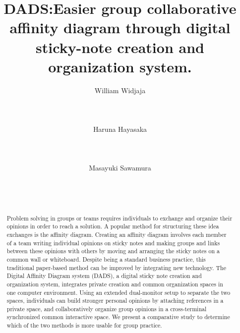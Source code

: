 \documentclass{sigchi}
\begin{document}
\title{DADS:Easier group collaborative affinity diagram through digital sticky-note creation and organization system.}

\author{
  \alignauthor William Widjaja\\
    \\
    \\
    \\
  \alignauthor Haruna Hayasaka \\
    \\
    \\
    \\   
  \alignauthor Masayuki Sawamura \\
    \\
    \\
    \\
}

\maketitle

\begin{abstract}
Problem solving in groups or teams requires individuals to exchange and organize their opinions in order to reach a solution. A popular method for structuring these idea exchanges is the affinity diagram. Creating an affinity diagram involves each member of a team writing individual opinions on sticky notes and making groups and links between these opinions with others by moving and arranging the sticky notes on a common wall or whiteboard. Despite being a standard business practice, this traditional paper-based method can be improved by integrating new technology. The Digital Affinity Diagram system (DADS), a digital sticky note creation and organization system, integrates private creation and common organization spaces in one computer environment. Using an extended dual-monitor setup to separate the two spaces, individuals can build stronger personal opinions by attaching references in a private space, and collaboratively organize group opinions in a cross-terminal synchronized common interactive space.  We present a comparative study to determine which of the two methods is more usable for group practice. 
\end{abstract}
\end{document}
